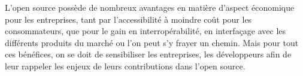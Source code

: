 				L'open source possède de nombreux avantages en matière d'aspect économique pour les entreprises, tant par l'accessibilité à moindre coût pour les consommateurs, que pour le gain en interropérabilité, en interfaçage avec les différents produits du marché ou l'on peut s'y frayer un chemin. Mais pour tout ces bénéfices, on se doit de sensibiliser les entreprises, les développeurs afin de leur rappeler les enjeux de leurs contributions dans l'open source.










